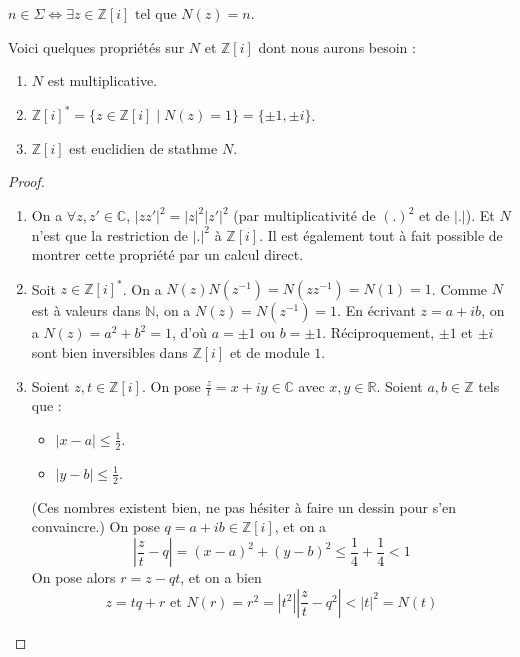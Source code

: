   \begin{remark}
    \label{theoreme-des-deux-carres-fermat-2}
    $n \in \Sigma \iff \exists z \in \mathbb{Z}[i] \text{ tel que } N(z)=n$.
  \end{remark}

  \begin{lemma}
    \label{theoreme-des-deux-carres-fermat-3}
    Voici quelques propriétés sur $N$ et $\mathbb{Z}[i]$ dont nous aurons besoin :
    \begin{enumerate}[label={\bfseries(\roman*)}]
      \item $N$ est multiplicative.
      \item $\mathbb{Z}[i]^* = \{ z \in \mathbb{Z}[i] \mid N(z) = 1 \} = \{ \pm 1, \pm i \}$.
      \item $\mathbb{Z}[i]$ est euclidien de stathme $N$.
    \end{enumerate}
  \end{lemma}

  \begin{proof}
    \begin{enumerate}[label={\bfseries(\roman*)}]
      \item On a $\forall z, z' \in \mathbb{C}$, $|zz'|^2 = |z|^2 |z'|^2$ (par multiplicativité de $(.)^2$ et de $|.|$). Et $N$ n'est que la restriction de $|.|^2$ à $\mathbb{Z}[i]$. Il est également tout à fait possible de montrer cette propriété par un calcul direct.
      \item Soit $z \in \mathbb{Z}[i]^*$. On a $N(z)N(z^{-1}) = N(zz^{-1}) = N(1) = 1$. Comme $N$ est à valeurs dans $\mathbb{N}$, on a $N(z) = N(z^{-1}) = 1$. En écrivant $z = a+ib$, on a $N(z) = a^2 + b^2 = 1$, d'où $a = \pm 1$ ou $b = \pm 1$. Réciproquement, $\pm 1$ et $\pm i$ sont bien inversibles dans $\mathbb{Z}[i]$ et de module $1$.
      \item Soient $z, t \in \mathbb{Z}[i]$. On pose $\frac{z}{t} = x + iy \in \mathbb{C}$ avec $x, y \in \mathbb{R}$. Soient $a, b \in \mathbb{Z}$ tels que :
      \begin{itemize}
        \item $|x-a| \leq \frac{1}{2}$.
        \item $|y-b| \leq \frac{1}{2}$.
      \end{itemize}
      (Ces nombres existent bien, ne pas hésiter à faire un dessin pour s'en convaincre.) On pose $q = a+ib \in \mathbb{Z}[i]$, et on a
      \[ \left| \frac{z}{t} - q \right| = (x-a)^2 + (y-b)^2 \leq \frac{1}{4} + \frac{1}{4} < 1 \]
      On pose alors $r = z-qt$, et on a bien
      \[ z = tq+r \text{ et } N(r) = r^2 = |t^2| \left| \frac{z}{t} - q^2 \right| < |t|^2 = N(t) \]
    \end{enumerate}
  \end{proof}

